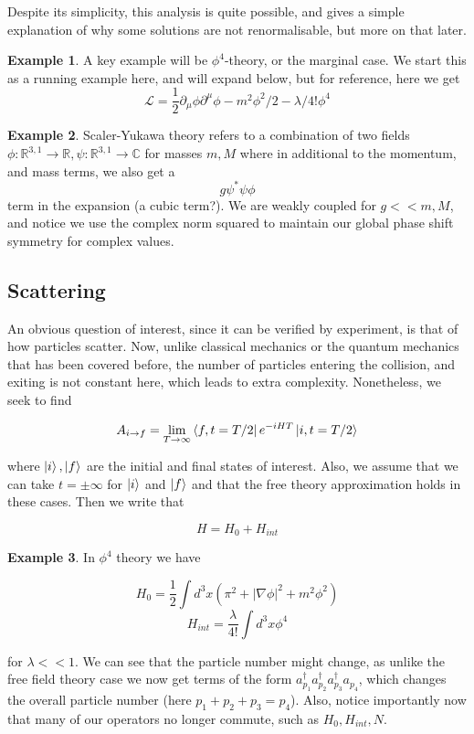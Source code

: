 \documentclass{article}
\theoremstyle{definition}
\newtheorem{example}{Example}
\begin{document}
Despite its simplicity, this analysis is quite possible, and gives a simple
explanation of why some solutions are not renormalisable, but more on that
later.

\begin{example}
  A key example will be $\phi^4$-theory, or the marginal case. We start this as
  a running example here, and will expand below, but for reference, here we get
  $$ \mathcal{L} = \frac{1}{2} \partial_\mu \phi \partial^\mu \phi - m^2 \phi^2
  / 2 - \lambda / 4! \phi^4 $$
\end{example}

\begin{example}
  Scaler-Yukawa theory refers to a combination of two fields $\phi :
  \mathbb{R}^{3, 1} \to \mathbb{R}, \psi: \mathbb{R}^{3, 1} \to \mathbb{C}$ for
  masses $m, M$ where in additional to the momentum, and mass terms, we also get
  a
  $$ g \psi^* \psi \phi $$
  term in the expansion (a cubic term?). We are weakly coupled for $g << m, M$,
  and notice we use the complex norm squared to maintain our global phase shift
  symmetry for complex values.
\end{example}

\subsection{Scattering}

An obvious question of interest, since it can be verified by experiment, is that
of how particles scatter. Now, unlike classical mechanics or the quantum
mechanics that has been covered before, the number of particles entering the
collision, and exiting is not constant here, which leads to extra complexity.
Nonetheless, we seek to find

$$ A_{i\to f} = \lim_{T \to \infty} \bra{f, t = T/2} e^{-iHT} \ket{i, t =
  T/2} $$

where $\ket{i}, \ket{f}$ are the initial and final states of interest. Also, we
assume that we can take $t = \pm \infty$ for $\ket{i}$ and $\ket{f}$ and that
the free theory approximation holds in these cases. Then we write that

$$ H = H_0 + H_{int} $$

\begin{example}
  In $\phi^4$ theory we have

  $$ H_0 = \frac{1}{2} \int d^3x (\pi^2 + |\nabla \phi|^2 + m^2 \phi^2) $$
  $$ H_{int} = \frac{\lambda}{4!} \int d^3x \phi^4 $$

  for $\lambda << 1$. We can see that the particle number might change, as
  unlike the free field theory case we now get terms of the form
  $a_{p_1}^\dagger a_{p_2}^\dagger a_{p_3}^\dagger a_{p_4}$, which changes the
  overall particle number (here $p_1 + p_2 + p_3 = p_4$). Also, notice
  importantly now that many of our operators no longer commute, such as $H_0,
  H_{int}, N$.
\end{example}
\end{document}
